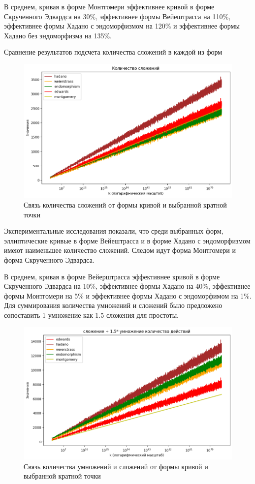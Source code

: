В среднем, кривая в форме Монтгомери эффективнее кривой в форме Скрученного Эдвардса на 30\%, эффективнее формы Вейештрасса на 110\%, эффективнее формы Хадано с эндоморфизмом на 120\% и эффективнее формы Хадано без эндоморфизма на 135\%.

\pagebreak

Сравнение результатов подсчета количества сложений в каждой из форм 
\begin{figure}[h]
  \centering
  \includegraphics[width=\linewidth]{./additions.png}
  \caption{Связь количества сложений от формы кривой и выбранной кратной точки}
  \end{figure}

Экспериментальные исследования показали, что среди выбранных форм, эллиптические кривые в форме Вейештрасса и в форме Хадано с эндоморфизмом имеют наименьшее количество сложений. Следом идут форма Монтгомери и форма Скрученного Эдвардса.

В среднем, кривая в форме Вейерштрасса эффективнее кривой в форме Скрученного Эдвардса на 10\%, эффективнее формы Хадано на 40\%, эффективнее формы Монтгомери на 5\% и эффективнее формы Хадано с эндоморфимом на 1\%.
\pagebreak
Для суммирования количества умножений и сложений было предложено сопоставить 1 умножение как 1.5 сложения для простоты. 
\begin{figure}[h]
  \centering
  \includegraphics[width=\linewidth]{./add_and_mul.png}
  \caption{Связь количества умножений и сложений от формы кривой и выбранной кратной точки}
  \end{figure}

